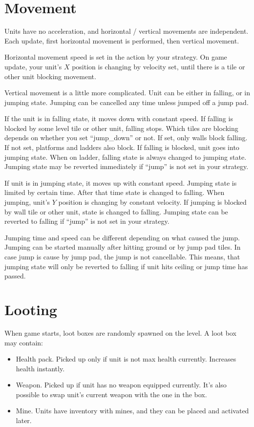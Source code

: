 \section{Movement}

Units have no acceleration, and horizontal / vertical movements are independent.
Each update, first horizontal movement is performed, then vertical movement.

Horizontal movement speed is set in the action by your strategy.
On game update, your unit's $X$ position is changing by velocity set, until there is a tile or other unit blocking movement.

Vertical movement is a little more complicated. Unit can be either in falling, or in jumping state.
Jumping can be cancelled any time unless jumped off a jump pad.

If the unit is in falling state, it moves down with constant speed.
If falling is blocked by some level tile or other unit, falling stops.
Which tiles are blocking depends on whether you set ``jump\_down'' or not.
If set, only walls block falling. If not set, platforms and ladders also block.
If falling is blocked, unit goes into jumping state.
When on ladder, falling state is always changed to jumping state.
Jumping state may be reverted immediately if ``jump'' is not set in your strategy.

If unit is in jumping state, it moves up with constant speed.
Jumping state is limited by certain time. After that time state is changed to falling.
When jumping, unit's $Y$ position is changing by constant velocity.
If jumping is blocked by wall tile or other unit, state is changed to falling.
Jumping state can be reverted to falling if ``jump'' is not set in your strategy.

Jumping time and speed can be different depending on what caused the jump.
Jumping can be started manually after hitting ground or by jump pad tiles.
In case jump is cause by jump pad, the jump is not cancellable.
This means, that jumping state will only be reverted to falling if unit hits ceiling or jump time has passed.

\section{Looting}

When game starts, loot boxes are randomly spawned on the level. A loot box may contain:
\begin{itemize}
      \item Health pack. Picked up only if unit is not max health currently.
            Increases health instantly.
      \item Weapon. Picked up if unit has no weapon equipped currently.
            It's also possible to swap unit's current weapon with the one in the box.
      \item Mine. Units have inventory with mines, and they can be placed and activated later.
\end{itemize}

